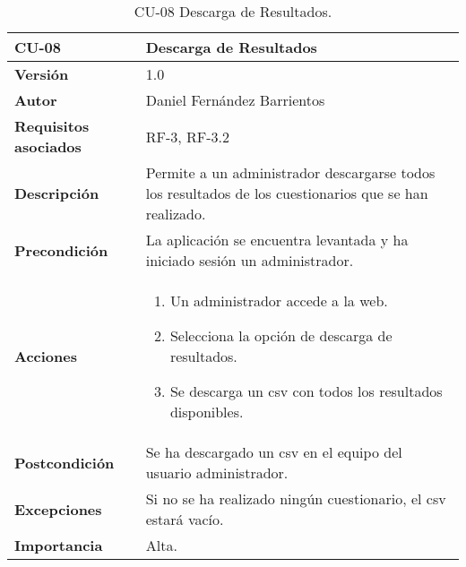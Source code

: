 \begin{table}[p]
	\centering
	\begin{tabularx}{\linewidth}{ p{} p{} }
		\toprule
		\textbf{CU-08}    & \textbf{Descarga de Resultados}\\
		\toprule
		\textbf{Versión}              & 1.0    \\
		\textbf{Autor}                & Daniel Fernández Barrientos \\
		\textbf{Requisitos asociados} & RF-3, RF-3.2 \\
		\textbf{Descripción}          & Permite a un administrador descargarse todos los resultados de los cuestionarios que se han realizado. \\
		\textbf{Precondición}         & La aplicación se encuentra levantada y ha iniciado sesión un administrador. \\
		\textbf{Acciones}             &
		\begin{enumerate}
			\def\labelenumi{\arabic{enumi}.}
			\tightlist
			\item Un administrador accede a la web.
			\item Selecciona la opción de descarga de resultados.
			\item Se descarga un csv con todos los resultados disponibles.
		\end{enumerate}\\
		\textbf{Postcondición}        & Se ha descargado un csv en el equipo del usuario administrador. \\
		\textbf{Excepciones}          & Si no se ha realizado ningún cuestionario, el csv estará vacío. \\
		\textbf{Importancia}          & Alta. \\
		\bottomrule
	\end{tabularx}
	\caption{CU-08 Descarga de Resultados.}
\end{table}

